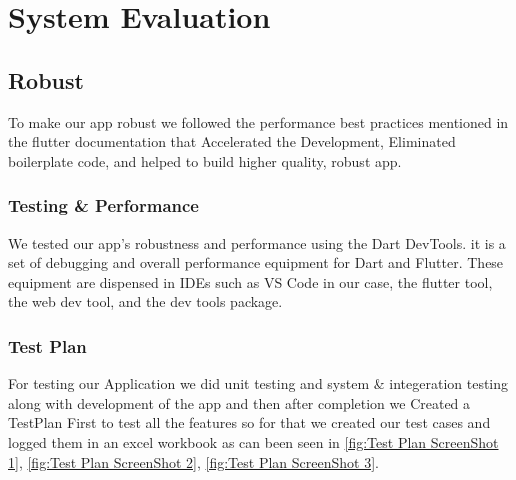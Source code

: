 \chapter{System Evaluation}
\section{Robust}
To make our app robust we followed the performance best practices mentioned in the flutter documentation that Accelerated the Development, Eliminated boilerplate code, and helped to build higher quality, robust app.
\subsection{Testing \& Performance}
We tested our app's robustness and performance using the Dart DevTools. it is a set of debugging and overall performance equipment for Dart and Flutter. These equipment are dispensed in IDEs such as VS Code in our case, the flutter tool, the web dev tool, and the dev tools package.
\subsection{Test Plan}
For testing our Application we did unit testing and system \& integeration testing along with development of the app and then after completion we Created a TestPlan First to test all the features so for that we created our test cases and logged them in an excel workbook as can been seen in \ref{fig:Test Plan ScreenShot 1}, \ref{fig:Test Plan ScreenShot 2}, \ref{fig:Test Plan ScreenShot 3}.

